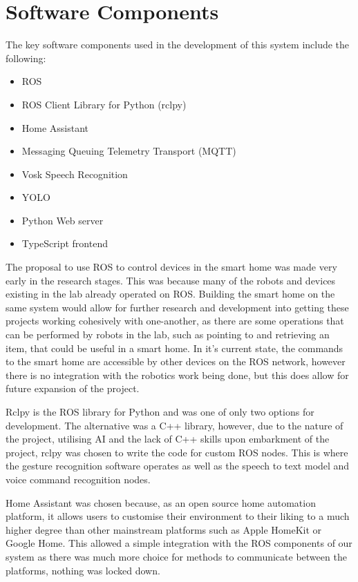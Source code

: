\section{Software Components}
The key software components used in the development of this system include the following:
\begin{itemize}
    \item ROS
    \item ROS Client Library for Python (rclpy)
    \item Home Assistant
    \item Messaging Queuing Telemetry Transport (MQTT)
    \item Vosk Speech Recognition
    \item YOLO
    \item Python Web server
    \item TypeScript frontend
\end{itemize}

The proposal to use ROS to control devices in the smart home was made very early in the research stages.
This was because many of the robots and devices existing in the lab already operated on ROS.
Building the smart home on the same system would allow for further research and development into getting these projects working cohesively with one-another, as there are some operations that can be performed by robots in the lab, such as pointing to and retrieving an item, that could be useful in a smart home.
In it's current state, the commands to the smart home are accessible by other devices on the ROS network, however there is no integration with the robotics work being done, but this does allow for future expansion of the project.

Rclpy is the ROS library for Python and was one of only two options for development.
The alternative was a C++ library, however, due to the nature of the project, utilising AI and the lack of C++ skills upon embarkment of the project, rclpy was chosen to write the code for custom ROS nodes.
This is where the gesture recognition software operates as well as the speech to text model and voice command recognition nodes.

Home Assistant was chosen because, as an open source home automation platform, it allows users to customise their environment to their liking to a much higher degree than other mainstream platforms such as Apple HomeKit or Google Home.
This allowed a simple integration with the ROS components of our system as there was much more choice for methods to communicate between the platforms, nothing was locked down.

